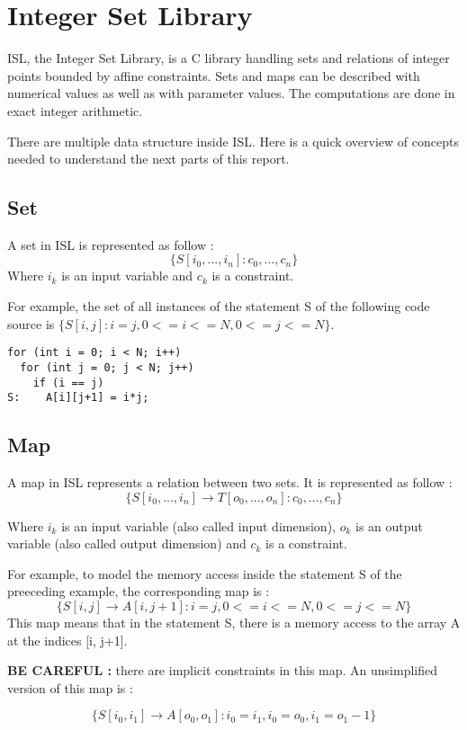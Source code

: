 \chapter{Integer Set Library}\label{ch:ISL}

ISL, the Integer Set Library, is a C library handling sets and relations of integer points bounded by affine constraints. Sets and maps can be described with numerical values as well as with parameter values. The computations are done in exact integer arithmetic. 

There are multiple data structure inside ISL. Here is a quick overview of concepts needed to understand the next parts of this report. 

\section{Set}
A set in ISL is represented as follow :
\[
\{S[i_0,...,i_n]:c_0,...,c_n\}
\]
Where $i_k$ is an input variable and $c_k$ is a constraint.

For example, the set of all instances of the statement S of the following code source is $\{S[i,j]:i=j,0<=i<=N,0<=j<=N\}$.
\begin{lstlisting}[frame=single]
for (int i = 0; i < N; i++)
  for (int j = 0; j < N; j++)
    if (i == j)
S:    A[i][j+1] = i*j;
\end{lstlisting}

\section{Map}
A map in ISL represents a relation between two sets. It is represented as follow :
\[
\{S[i_0,...,i_n] \rightarrow T[o_0,...,o_n]:c_0,...,c_n\}
\]

Where $i_k$ is an input variable (also called input dimension), $o_k$ is an output variable (also called output dimension) and $c_k$ is a constraint.

For example, to model the memory access inside the statement S of the preeceding example, the corresponding map is :
\[
\{S[i,j] \rightarrow A[i,j+1]:i=j,0<=i<=N,0<=j<=N\}
\]
This map means that in the statement S, there is a memory access to the array A at the indices [i, j+1].

\textbf{BE CAREFUL :} there are implicit constraints in this map. An unsimplified version of this map is :

\[
\{S[i_0,i_1] \rightarrow A[o_0,o_1]:i_0=i_1,i_0=o_0,i_1=o_1-1\}
\]

